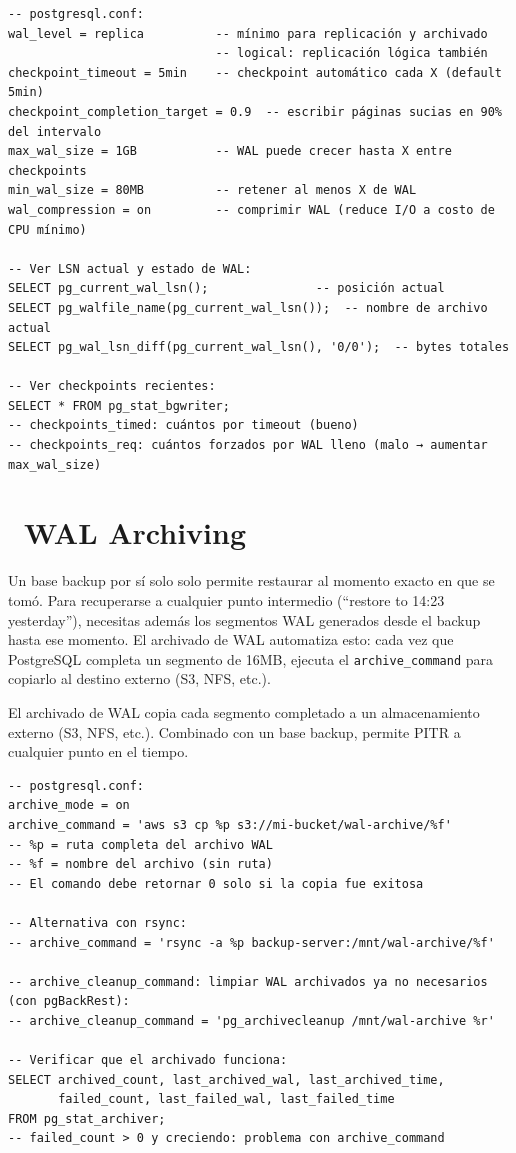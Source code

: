 \begin{lstlisting}[caption={Parámetros WAL críticos}]
-- postgresql.conf:
wal_level = replica          -- mínimo para replicación y archivado
                             -- logical: replicación lógica también
checkpoint_timeout = 5min    -- checkpoint automático cada X (default 5min)
checkpoint_completion_target = 0.9  -- escribir páginas sucias en 90% del intervalo
max_wal_size = 1GB           -- WAL puede crecer hasta X entre checkpoints
min_wal_size = 80MB          -- retener al menos X de WAL
wal_compression = on         -- comprimir WAL (reduce I/O a costo de CPU mínimo)

-- Ver LSN actual y estado de WAL:
SELECT pg_current_wal_lsn();               -- posición actual
SELECT pg_walfile_name(pg_current_wal_lsn());  -- nombre de archivo actual
SELECT pg_wal_lsn_diff(pg_current_wal_lsn(), '0/0');  -- bytes totales

-- Ver checkpoints recientes:
SELECT * FROM pg_stat_bgwriter;
-- checkpoints_timed: cuántos por timeout (bueno)
-- checkpoints_req: cuántos forzados por WAL lleno (malo → aumentar max_wal_size)
\end{lstlisting}

\section[WAL Archiving]{~WAL Archiving}

Un base backup por sí solo solo permite restaurar al momento exacto en que se tomó.
Para recuperarse a cualquier punto intermedio (``restore to 14:23 yesterday''), necesitas además los segmentos WAL generados desde el backup hasta ese momento.
El archivado de WAL automatiza esto: cada vez que PostgreSQL completa un segmento de 16MB, ejecuta el \texttt{archive\_command} para copiarlo al destino externo (S3, NFS, etc.).

El archivado de WAL copia cada segmento completado a un almacenamiento externo (S3, NFS, etc.).
Combinado con un base backup, permite PITR a cualquier punto en el tiempo.

\begin{lstlisting}[caption={Configurar WAL archiving}]
-- postgresql.conf:
archive_mode = on
archive_command = 'aws s3 cp %p s3://mi-bucket/wal-archive/%f'
-- %p = ruta completa del archivo WAL
-- %f = nombre del archivo (sin ruta)
-- El comando debe retornar 0 solo si la copia fue exitosa

-- Alternativa con rsync:
-- archive_command = 'rsync -a %p backup-server:/mnt/wal-archive/%f'

-- archive_cleanup_command: limpiar WAL archivados ya no necesarios (con pgBackRest):
-- archive_cleanup_command = 'pg_archivecleanup /mnt/wal-archive %r'

-- Verificar que el archivado funciona:
SELECT archived_count, last_archived_wal, last_archived_time,
       failed_count, last_failed_wal, last_failed_time
FROM pg_stat_archiver;
-- failed_count > 0 y creciendo: problema con archive_command
\end{lstlisting}

